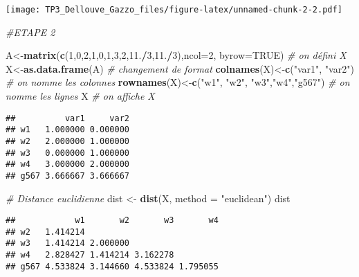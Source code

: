 \documentclass[
]{article}
\newenvironment{Shaded}{\begin{snugshade}}{\end{snugshade}}
\newcommand{\CommentTok}[1]{\textcolor[rgb]{0.56,0.35,0.01}{\textit{#1}}}
\newcommand{\DataTypeTok}[1]{\textcolor[rgb]{0.13,0.29,0.53}{#1}}
\newcommand{\DecValTok}[1]{\textcolor[rgb]{0.00,0.00,0.81}{#1}}
\newcommand{\FloatTok}[1]{\textcolor[rgb]{0.00,0.00,0.81}{#1}}
\newcommand{\KeywordTok}[1]{\textcolor[rgb]{0.13,0.29,0.53}{\textbf{#1}}}
\newcommand{\NormalTok}[1]{#1}
\newcommand{\OperatorTok}[1]{\textcolor[rgb]{0.81,0.36,0.00}{\textbf{#1}}}
\newcommand{\OtherTok}[1]{\textcolor[rgb]{0.56,0.35,0.01}{#1}}
\newcommand{\StringTok}[1]{\textcolor[rgb]{0.31,0.60,0.02}{#1}}
\begin{document}
\texttt{[image: TP3\_Dellouve\_Gazzo\_files/figure-latex/unnamed-chunk-2-2.pdf]}

\begin{Shaded}
\begin{Highlighting}[]
\CommentTok{#ETAPE 2}

\NormalTok{A<-}\KeywordTok{matrix}\NormalTok{(}\KeywordTok{c}\NormalTok{(}\DecValTok{1}\NormalTok{,}\DecValTok{0}\NormalTok{,}\DecValTok{2}\NormalTok{,}\DecValTok{1}\NormalTok{,}\DecValTok{0}\NormalTok{,}\DecValTok{1}\NormalTok{,}\DecValTok{3}\NormalTok{,}\DecValTok{2}\NormalTok{,}\FloatTok{11.}\OperatorTok{/}\DecValTok{3}\NormalTok{,}\FloatTok{11.}\OperatorTok{/}\DecValTok{3}\NormalTok{),}\DataTypeTok{ncol=}\DecValTok{2}\NormalTok{, }\DataTypeTok{byrow=}\OtherTok{TRUE}\NormalTok{) }\CommentTok{# on défini X}
\NormalTok{X<-}\KeywordTok{as.data.frame}\NormalTok{(A) }\CommentTok{# changement de format}
\KeywordTok{colnames}\NormalTok{(X)<-}\KeywordTok{c}\NormalTok{(}\StringTok{"var1"}\NormalTok{, }\StringTok{"var2"}\NormalTok{) }\CommentTok{# on nomme les colonnes}
\KeywordTok{rownames}\NormalTok{(X)<-}\KeywordTok{c}\NormalTok{(}\StringTok{"w1"}\NormalTok{, }\StringTok{"w2"}\NormalTok{, }\StringTok{"w3"}\NormalTok{,}\StringTok{"w4"}\NormalTok{,}\StringTok{"g567"}\NormalTok{) }\CommentTok{# on nomme les lignes}
\NormalTok{X }\CommentTok{# on affiche X}
\end{Highlighting}
\end{Shaded}

\begin{verbatim}
##          var1     var2
## w1   1.000000 0.000000
## w2   2.000000 1.000000
## w3   0.000000 1.000000
## w4   3.000000 2.000000
## g567 3.666667 3.666667
\end{verbatim}

\begin{Shaded}
\begin{Highlighting}[]
\CommentTok{# Distance euclidienne}
\NormalTok{dist <-}\StringTok{ }\KeywordTok{dist}\NormalTok{(X, }\DataTypeTok{method =} \StringTok{"euclidean"}\NormalTok{)}
\NormalTok{dist}
\end{Highlighting}
\end{Shaded}

\begin{verbatim}
##            w1       w2       w3       w4
## w2   1.414214                           
## w3   1.414214 2.000000                  
## w4   2.828427 1.414214 3.162278         
## g567 4.533824 3.144660 4.533824 1.795055
\end{verbatim}
\end{document}
